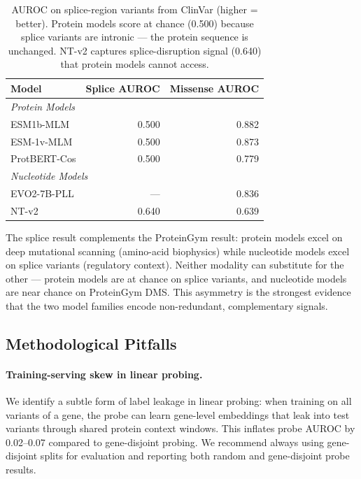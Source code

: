 \documentclass[9pt]{article}
\begin{document}
\begin{table}[h]
\centering
\caption{AUROC on splice-region variants from ClinVar (higher = better). Protein models score at chance (0.500) because splice variants are intronic --- the protein sequence is unchanged. NT-v2 captures splice-disruption signal (0.640) that protein models cannot access.}
\label{tab:splice_validation}
\small
\begin{tabular}{lrr}
\toprule
\textbf{Model} & \textbf{Splice AUROC} & \textbf{Missense AUROC} \\
\midrule
\multicolumn{3}{l}{\textit{Protein Models}} \\
ESM1b-MLM & 0.500 & 0.882 \\
ESM-1v-MLM & 0.500 & 0.873 \\
ProtBERT-Cos & 0.500 & 0.779 \\
\midrule
\multicolumn{3}{l}{\textit{Nucleotide Models}} \\
EVO2-7B-PLL & --- & 0.836 \\
NT-v2 & 0.640 & 0.639 \\
\bottomrule
\end{tabular}
\end{table}

The splice result complements the ProteinGym result: protein models excel on deep mutational scanning (amino-acid biophysics) while nucleotide models excel on splice variants (regulatory context). Neither modality can substitute for the other --- protein models are at chance on splice variants, and nucleotide models are near chance on ProteinGym DMS. This asymmetry is the strongest evidence that the two model families encode non-redundant, complementary signals.

\subsection{Methodological Pitfalls}

\paragraph{Training-serving skew in linear probing.} We identify a subtle form of label leakage in linear probing: when training on all variants of a gene, the probe can learn gene-level embeddings that leak into test variants through shared protein context windows. This inflates probe AUROC by 0.02--0.07 compared to gene-disjoint probing. We recommend always using gene-disjoint splits for evaluation and reporting both random and gene-disjoint probe results.
\end{document}
